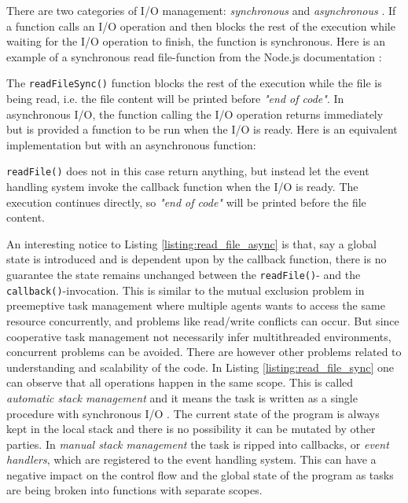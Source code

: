 There are two categories of I/O management: \textit{synchronous} and
\textit{asynchronous} \cite{adya2002cooperative}. If a function calls an I/O
operation and then blocks the rest of the execution while waiting for the I/O
operation to finish, the function is synchronous. Here is an example of a
synchronous read file-function from the Node.js documentation
\cite{nodejs-docs}:



The \lstinline{readFileSync()} function blocks the rest of the execution while
the file is being read, i.e. the file content will be printed before
\textit{"end of code"}. In asynchronous I/O, the function calling the I/O
operation returns immediately but is provided a function to be run when the I/O
is ready. Here is an equivalent implementation but with an asynchronous
function:



\lstinline{readFile()} does not in this case return anything, but instead let
the event handling system invoke the callback function when the I/O is ready.
The execution continues directly, so \textit{"end of code"} will be printed
before the file content.

An interesting notice to Listing \ref{listing:read_file_async} is that, say a
global state is introduced and is dependent upon by the callback function,
there is no guarantee the state remains unchanged between the
\lstinline{readFile()}- and the \lstinline{callback()}-invocation. This is
similar to the mutual exclusion problem in preemeptive task management where
multiple agents wants to access the same resource concurrently, and problems
like read/write conflicts can occur. But since cooperative task management not
necessarily infer multithreaded environments, concurrent problems can be
avoided. There are however other problems related to understanding and
scalability of the code. In Listing \ref{listing:read_file_sync} one can
observe that all operations happen in the same scope. This is called
\textit{automatic stack management} and it means the task is written as a
single procedure with synchronous I/O \cite{adya2002cooperative}. The current
state of the program is always kept in the local stack and there is no
possibility it can be mutated by other parties. In \textit{manual stack
management} the task is ripped into callbacks, or \textit{event handlers},
which are registered to the event handling system. This can have a negative
impact on the control flow and the global state of the program as tasks are
being broken into functions with separate scopes.

